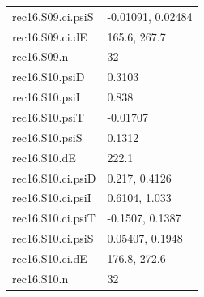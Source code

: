 {\begin{longtable}{p{}p{}}
{}rec16.S09.ci.psiS & -0.01091, 0.02484\\
{}rec16.S09.ci.dE & 165.6, 267.7\\
{}rec16.S09.n & 32\\
{}rec16.S10.psiD & 0.3103\\
{}rec16.S10.psiI & 0.838\\
{}rec16.S10.psiT & -0.01707\\
{}rec16.S10.psiS & 0.1312\\
{}rec16.S10.dE & 222.1\\
{}rec16.S10.ci.psiD & 0.217, 0.4126\\
{}rec16.S10.ci.psiI & 0.6104, 1.033\\
{}rec16.S10.ci.psiT & -0.1507, 0.1387\\
{}rec16.S10.ci.psiS & 0.05407, 0.1948\\
{}rec16.S10.ci.dE & 176.8, 272.6\\
{}rec16.S10.n & 32\\
\bottomrule\end{longtable}}

